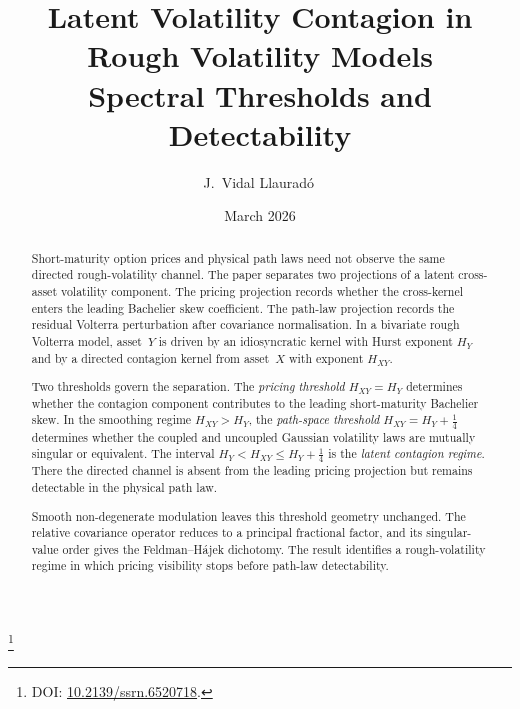 \documentclass[11pt,a4paper]{amsart}
\theoremstyle{plain}
\theoremstyle{definition}
\theoremstyle{remark}
\begin{document}
\title[Latent Volatility Contagion]{%
Latent Volatility Contagion in Rough Volatility Models\\[0.3em]
{\small Spectral Thresholds and Detectability}}
\author[J.~Vidal Llaurad\'o]{J.~Vidal Llaurad\'o\,}
\thanks{DOI: \href{https://doi.org/10.2139/ssrn.6520718}{10.2139/ssrn.6520718}.}
\date{March 2026}

\begin{abstract}
Short-maturity option prices and physical path laws need not observe the same directed
rough-volatility channel.  The paper separates two projections of a latent cross-asset volatility
component.  The pricing projection records whether the cross-kernel enters the leading Bachelier
skew coefficient.  The path-law projection records the residual Volterra perturbation after
covariance normalisation.  In a bivariate rough Volterra model, asset~$Y$ is driven by an
idiosyncratic kernel with Hurst exponent $H_Y$ and by a directed contagion kernel from asset~$X$
with exponent $H_{XY}$.

Two thresholds govern the separation.  The \emph{pricing threshold} $H_{XY}=H_Y$ determines whether
the contagion component contributes to the leading short-maturity Bachelier skew.  In the smoothing
regime $H_{XY}>H_Y$, the \emph{path-space threshold} $H_{XY}=H_Y+\tfrac14$ determines whether the
coupled and uncoupled Gaussian volatility laws are mutually singular or equivalent.  The interval
$H_Y < H_{XY} \le H_Y+\tfrac14$ is the \emph{latent contagion regime}.  There the directed channel is
absent from the leading pricing projection but remains detectable in the physical path law.

Smooth non-degenerate modulation leaves this threshold geometry unchanged.  The relative covariance
operator reduces to a principal fractional factor, and its singular-value order gives the
Feldman--H\'ajek dichotomy.  The result identifies a rough-volatility regime in which pricing
visibility stops before path-law detectability.
\end{abstract}


\maketitle
\end{document}
